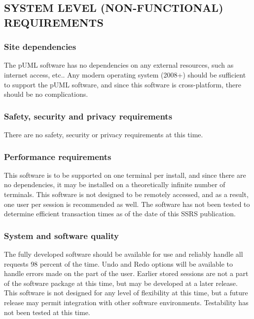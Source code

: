 \documentclass[twoside,letterpaper]{article}
\begin{document}
\subsection[SYSTEM LEVEL (NON{}-FUNCTIONAL)
REQUIREMENTS]{\rmfamily\bfseries\color{black}
SYSTEM LEVEL (NON-FUNCTIONAL) REQUIREMENTS}

\subsubsection[Site dependencies]{\rmfamily\bfseries\color{black}
Site dependencies}
{\color{black}
The pUML software has no dependencies on any external resources, such as internet access, etc..
Any modern operating system (2008+) should be sufficient to support the pUML software,
and since this software is cross-platform, there should be no complications.
}

\subsubsection[Safety, security and privacy requirements]{\rmfamily\bfseries\color{black}
Safety, security and privacy requirements}
{\color{black}
There are no safety, security or privacy requirements at this time.
}

\subsubsection[Performance requirements]{\rmfamily\bfseries\color{black}
Performance requirements}
{\color{black}
This software is to be supported on one terminal per install, and since there are no dependencies,
it may be installed on a theoretically infinite number of terminals. This software is not designed to
be remotely accessed, and as a result, one user per session is recommended as well.
The software has not been tested to determine efficient transaction times as of the date of this SSRS publication.
}

\subsubsection[System and software quality]{\rmfamily\bfseries\color{black} System
and software quality}
{\color{black}
The fully developed software should be available for use and reliably handle all requests 98 percent of the time.  
Undo and Redo options will be available to handle errors made on the part of the user.  
Earlier stored sessions are not a part of the software package at this time, but may be developed at a later release.
This software is not designed for any level of flexibility at this time, but a future release may permit
integration with other software environments. Testability has not been tested at this time.
}
\end{document}
